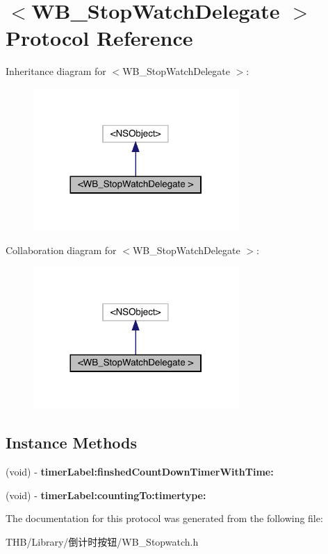 \hypertarget{protocol_w_b___stop_watch_delegate_01-p}{}\section{$<$W\+B\+\_\+\+Stop\+Watch\+Delegate $>$ Protocol Reference}
\label{protocol_w_b___stop_watch_delegate_01-p}


Inheritance diagram for $<$W\+B\+\_\+\+Stop\+Watch\+Delegate $>$\+:\nopagebreak
\begin{figure}[H]
\begin{center}
\leavevmode
\includegraphics[width=221pt]{protocol_w_b___stop_watch_delegate_01-p__inherit__graph}
\end{center}
\end{figure}


Collaboration diagram for $<$W\+B\+\_\+\+Stop\+Watch\+Delegate $>$\+:\nopagebreak
\begin{figure}[H]
\begin{center}
\leavevmode
\includegraphics[width=221pt]{protocol_w_b___stop_watch_delegate_01-p__coll__graph}
\end{center}
\end{figure}
\subsection*{Instance Methods}
\begin{DoxyCompactItemize}
\item 
\mbox{\label{protocol_w_b___stop_watch_delegate_01-p_a83923c1b5d1f69c38b23eb17a13aae14}} 
(void) -\/ {\bfseries timer\+Label\+:finshed\+Count\+Down\+Timer\+With\+Time\+:}
\item 
\mbox{\label{protocol_w_b___stop_watch_delegate_01-p_ad91fc8a408d2a8d9d635ec5a846012de}} 
(void) -\/ {\bfseries timer\+Label\+:counting\+To\+:timertype\+:}
\end{DoxyCompactItemize}


The documentation for this protocol was generated from the following file\+:\begin{DoxyCompactItemize}
\item 
T\+H\+B/\+Library/倒计时按钮/W\+B\+\_\+\+Stopwatch.\+h\end{DoxyCompactItemize}
